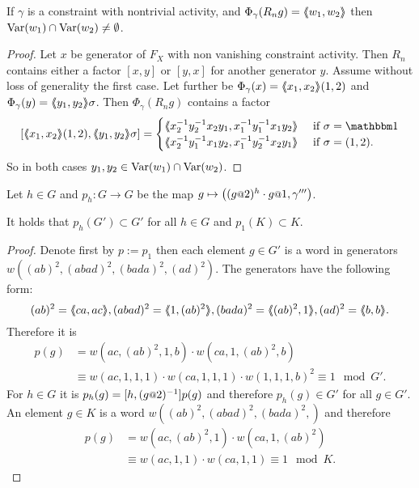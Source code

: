 \documentclass[a4paper,11pt]{amsart}
\begin{document}
\begin{lem} \label{lem:commonVar}
 If $\gamma$ is a constraint with nontrivial activity, and $\Phi_\gamma(R_ng)=\langle\negthickspace\langle w_1,w_2\rangle\negthickspace\rangle$ then $\textup{Var}(w_1)\cap\textup{Var}(w_2)\neq \emptyset$.
\end{lem}
\begin{proof}
 Let $x$ be generator of $F_X$ with non vanishing constraint activity. 
 Then $R_n$ contains either a factor $[x,y]$ or $[y,x]$ for another generator $y$. Assume without loss of generality the first case.
 Let further be $\Phi_\gamma(x)=\langle\negthickspace\langle x_1,x_2\rangle\negthickspace\rangle(1,2)$ and $\Phi_\gamma(y)=\langle\negthickspace\langle y_1,y_2\rangle\negthickspace\rangle\sigma$. 
 Then $\Phi_\gamma(R_n g)$ contains a factor 
 \[ [\pair{x_1,x_2}(1,2),\pair{y_1,y_2}\sigma] = \begin{cases}
                                                   \pair{x_2^{-1}y_2^{-1}x_2y_1,x_1^{-1}y_1^{-1}x_1y_2} & \textup{ if } \sigma=\id \\
                                                   \pair{x_2^{-1}y_1^{-1}x_1y_2,x_1^{-1}y_2^{-1}x_2y_1} & \textup{ if } \sigma=(1,2) . \\
                                                 \end{cases}
\] So in both cases $y_1,y_2\in \textup{Var}(w_1)\cap \textup{Var}(w_2)$. 
\end{proof}
\begin{lem} \label{lem:productOfStatesIsInDerived} 
 Let $h\in G$ and $p_h\colon G\to G$ be the map $g\mapsto \left((g\at{2})^{h}\cdot g\at{1},\gamma'''\right)$.
 
 It holds that $p_h(G')\subset G'$ for all $h\in G$ and $p_1(K)\subset K$. 
\end{lem}
\begin{proof}
 Denote first by $p:=p_1$ then
 each element $g\in G'$ is a word in generators $w((ab)^2,(abad)^2,(bada)^2,(ad)^2)$. 
 The generators have the following form:
 \[(ab)^2=\pair{ca,ac}, (abad)^2 = \pair{1,(ab)^2}, (bada)^2=\pair{(ab)^2,1}, (ad)^2=\pair{b,b}.\]
 Therefore it is
 \begin{align*}
  p(g) &= w(ac,(ab)^2,1,b) \cdot w(ca,1,(ab)^2,b)\\ &\equiv w(ac,1,1,1) \cdot w(ca,1,1,1) \cdot w(1,1,1,b)^2 \equiv 1 \mod G'.
 \end{align*}
 For $h\in G$ it is $p_h(g)=[h,(g\at{2})^{-1}]p(g)$ and therefore $p_h(g)\in G'$ for all $g\in G'$.
 An element $g\in K$ is a word $w((ab)^2,(abad)^2,(bada)^2,)$ and therefore
 \begin{align*}
  p(g) &= w(ac,(ab)^2,1) \cdot w(ca,1,(ab)^2)\\ &\equiv w(ac,1,1) \cdot w(ca,1,1) \equiv 1 \mod K.
 \end{align*}
\end{proof}
\end{document}
